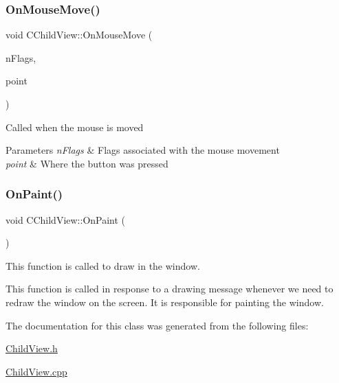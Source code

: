 \subsubsection{\texorpdfstring{OnMouseMove()}{OnMouseMove()}}
{\footnotesize\ttfamily void C\+Child\+View\+::\+On\+Mouse\+Move (\begin{DoxyParamCaption}\item[{U\+I\+NT}]{n\+Flags,  }\item[{C\+Point}]{point }\end{DoxyParamCaption})}

Called when the mouse is moved 
\begin{DoxyParams}{Parameters}
{\em n\+Flags} & Flags associated with the mouse movement \\
\hline
{\em point} & Where the button was pressed \\
\hline
\end{DoxyParams}
\mbox{\label{class_c_child_view_a8ea6d42631a4f9f446923ff864b239ab}} 
\subsubsection{\texorpdfstring{OnPaint()}{OnPaint()}}
{\footnotesize\ttfamily void C\+Child\+View\+::\+On\+Paint (\begin{DoxyParamCaption}{ }\end{DoxyParamCaption})\hspace{0.3cm}{\ttfamily [protected]}}

This function is called to draw in the window.

This function is called in response to a drawing message whenever we need to redraw the window on the screen. It is responsible for painting the window. 

The documentation for this class was generated from the following files\+:\begin{DoxyCompactItemize}
\item 
\mbox{\hyperlink{_child_view_8h}{Child\+View.\+h}}\item 
\mbox{\hyperlink{_child_view_8cpp}{Child\+View.\+cpp}}\end{DoxyCompactItemize}
